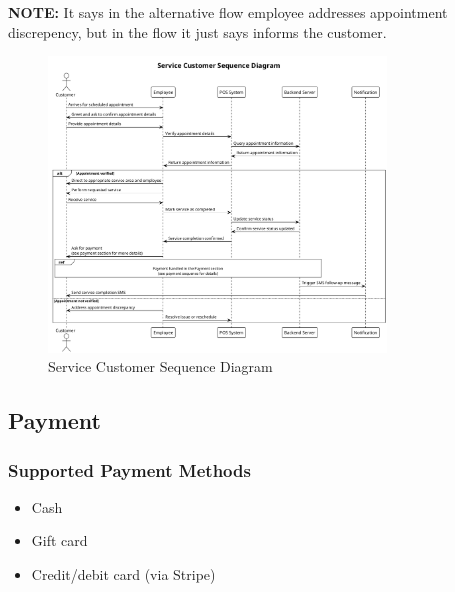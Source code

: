 \documentclass[]{VUMIFTemplateClass}
\newcommand{\noticecomment}[1]{%
    \begin{tcolorbox}[colback=blue!20, colframe=blue!60, arc=0pt, outer arc=0pt, boxrule=1pt, left=3pt, right=3pt, top=3pt, bottom=3pt]
        \textbf{\textcolor{blue!70!black}{NOTE:}} #1
    \end{tcolorbox}
}
\begin{document}
\noticecomment{It says in the alternative flow employee addresses appointment discrepency, but in the flow it just says informs the customer. }

\begin{figure}[H]
    \centering
    \includegraphics[width=0.8\textwidth]{images/diagrams/services/service_customer_sequence.png}
    \caption{Service Customer Sequence Diagram}
    \label{fig:service_customer_sequence}
\end{figure}




\subsection{Payment}

\subsubsection{Supported Payment Methods}
\begin{itemize}
\item Cash
\item Gift card
\item Credit/debit card (via Stripe)
\end{itemize}
\end{document}
